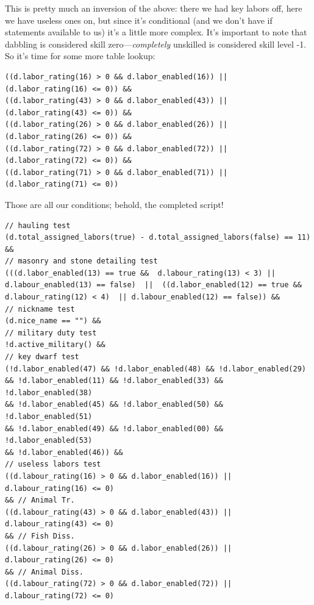 \documentclass[]{article}
\begin{document}
This is pretty much an inversion of the above: there we had key labors off, here we have useless ones on,
but since it's conditional (and we don't have if statements available to us) it's a little more complex.
It's important to note that dabbling is considered skill zero---\emph{completely} unskilled is considered
skill level -1. So it's time for some more table lookup:
\begin{verbatim}
((d.labor_rating(16) > 0 && d.labor_enabled(16)) || (d.labor_rating(16) <= 0)) &&
((d.labor_rating(43) > 0 && d.labor_enabled(43)) || (d.labor_rating(43) <= 0)) &&
((d.labor_rating(26) > 0 && d.labor_enabled(26)) || (d.labor_rating(26) <= 0)) &&
((d.labor_rating(72) > 0 && d.labor_enabled(72)) || (d.labor_rating(72) <= 0)) &&
((d.labor_rating(71) > 0 && d.labor_enabled(71)) || (d.labor_rating(71) <= 0))
\end{verbatim}

Those are all our conditions; behold, the completed script!
\begin{verbatim}
// hauling test
(d.total_assigned_labors(true) - d.total_assigned_labors(false) == 11) && 
// masonry and stone detailing test
(((d.labor_enabled(13) == true &&  d.labour_rating(13) < 3) ||
d.labour_enabled(13) == false)  ||  ((d.labor_enabled(12) == true && 
d.labour_rating(12) < 4)  || d.labour_enabled(12) == false)) &&
// nickname test
(d.nice_name == "") &&
// military duty test
!d.active_military() &&
// key dwarf test
(!d.labor_enabled(47) && !d.labor_enabled(48) && !d.labor_enabled(29)
&& !d.labor_enabled(11) && !d.labor_enabled(33) && !d.labor_enabled(38)
&& !d.labor_enabled(45) && !d.labor_enabled(50) && !d.labor_enabled(51)
&& !d.labor_enabled(49) && !d.labor_enabled(00) && !d.labor_enabled(53)
&& !d.labor_enabled(46)) &&
// useless labors test
((d.labour_rating(16) > 0 && d.labor_enabled(16)) || d.labour_rating(16) <= 0)
&& // Animal Tr.
((d.labour_rating(43) > 0 && d.labor_enabled(43)) || d.labour_rating(43) <= 0)
&& // Fish Diss.
((d.labour_rating(26) > 0 && d.labor_enabled(26)) || d.labour_rating(26) <= 0)
&& // Animal Diss.
((d.labour_rating(72) > 0 && d.labor_enabled(72)) || d.labour_rating(72) <= 0)
\end{verbatim}
\end{document}
